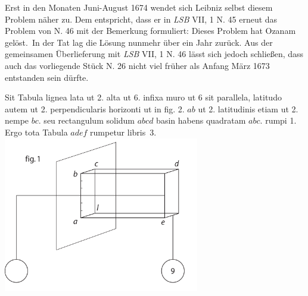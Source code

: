 \begin{Datierungsgruende}
Erst in den Monaten Juni-August 1674 wendet sich Leibniz selbst diesem Problem näher zu.
Dem entspricht, dass er in \textit{LSB} VII, 1 N. 45\cite{01086} erneut das Problem von N. 46\cite{01085}
mit der Bemerkung formuliert: \glqq Dieses Problem hat Ozanam gelöst.\grqq~In der Tat lag die Lösung nunmehr über ein Jahr zurück.
\newline%
\hspace*{7,5mm}%
Aus der gemeinsamen Überlieferung mit \textit{LSB} VII, 1 N. 46\cite{01085} lässt sich jedoch schließen,
dass auch das vorliegende Stück N. 26 %
nicht viel früher als Anfang März 1673 entstanden sein dürfte.
\end{Datierungsgruende}
\count{}
\count{}
\count{}
\pstartfirst
\noindent%
[52~v\textsuperscript{o}] Sit Tabula lignea lata ut 2. alta  ut 6.
infixa muro\protect{}
ut 6 sit parallela,
latitudo autem ut 2. perpendicularis
horizonti ut in fig. 2.
 $\displaystyle ab$ ut 2. latitudinis etiam ut 2.
nempe $\displaystyle bc.$ seu rectangulum solidum $\displaystyle abcd$
basin habens quadratam $\displaystyle abc.$ rumpi
1. Ergo tota Tabula $\displaystyle adef$ rumpetur
libris~3\protect{}.
\pend
\newpage%
\pstart
\noindent%
\centering%
\includegraphics[width=0.64\textwidth]{images/LH037,04_051-052d-1.pdf}
